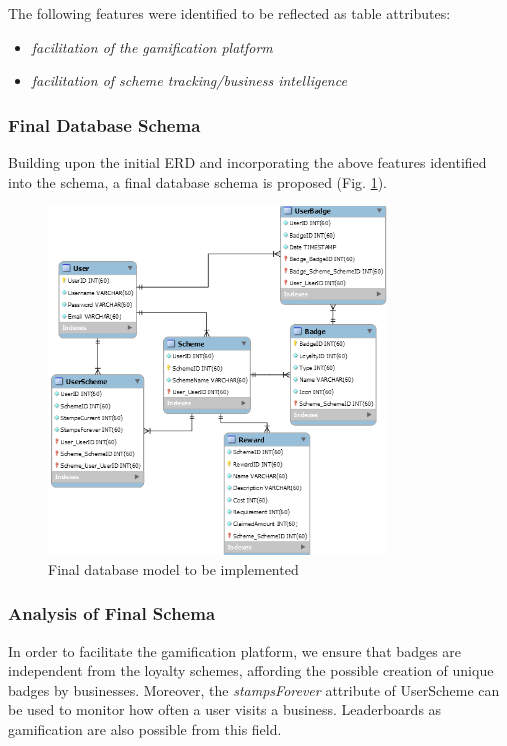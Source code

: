 The following features were identified to be reflected as table attributes:
\begin{itemize}
  \item \textit{facilitation of the gamification platform}
  \item \textit{facilitation of scheme tracking/business intelligence}
\end{itemize}

\newpage
\subsubsection{Final Database Schema}
Building upon the initial ERD and incorporating the above features identified into the schema, a final database schema is proposed  (Fig. \ref{fig:finaldb}). 

\begin{figure}[H]
  \centering
    \includegraphics[width=0.8\textwidth]{img/architecture.png}
      \caption{Final database model to be implemented}
      \label{fig:finaldb}
\end{figure}

\subsubsection{Analysis of Final Schema}
In order to facilitate the gamification platform, we ensure that badges are independent from the loyalty schemes, affording the possible creation of unique badges by businesses. Moreover, the \emph{stampsForever} attribute of UserScheme can be used to monitor how often a user visits a business. Leaderboards as gamification are also possible from this field.

